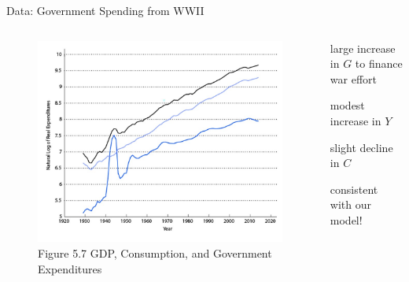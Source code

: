 \documentclass[11pt,aspectratio=169,usenames,dvipsnames]{beamer}
\let\tempone\itemize
\let\temptwo\enditemize
\renewenvironment{itemize}{\tempone\addtolength{\itemsep}{\fill}}{\temptwo}
\begin{document}
\begin{frame}{Data: Government Spending from WWII}
\label{slide:Data__Government_Spending_from_WWII}
    \begin{columns}
        \begin{column}{0.5\textwidth}
            \begin{figure}
                \caption{\scriptsize Figure 5.7  GDP, Consumption, and Government Expenditures}
                \includegraphics[width=\textwidth]{./figures/Figure5_7.jpg}
            \end{figure}
        \end{column}
        \begin{column}{0.5\textwidth}
            \begin{itemize}
                \item large increase in $ G $ to finance war effort
                \item modest increase in $ Y $
                \item slight decline in $ C $
                \item consistent with our model!
            \end{itemize}
        \end{column}
    \end{columns}
\end{frame}
\end{document}
